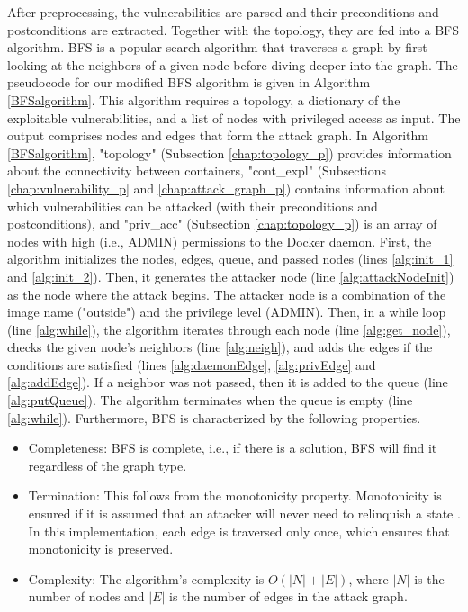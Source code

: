 After preprocessing, the vulnerabilities are parsed and their preconditions and postconditions are extracted. Together with the topology, they are fed into a BFS algorithm. BFS is a popular search algorithm that traverses a graph by first looking at the neighbors of a given node before diving deeper into the graph. The pseudocode for our modified BFS algorithm is given in Algorithm \ref{BFSalgorithm}. This algorithm requires a topology, a dictionary of the exploitable vulnerabilities, and a list of nodes with privileged access as input. The output comprises nodes and edges that form the attack graph. In Algorithm \ref{BFSalgorithm}, "topology" (Subsection \ref{chap:topology_p}) provides information about the connectivity between containers, "cont\_expl" (Subsections \ref{chap:vulnerability_p} and \ref{chap:attack_graph_p}) contains information about which vulnerabilities can be attacked (with their preconditions and postconditions), and "priv\_acc" (Subsection \ref{chap:topology_p}) is an array of nodes with high (i.e., ADMIN) permissions to the Docker daemon. First, the algorithm initializes the nodes, edges, queue, and passed nodes (lines \ref{alg:init_1} and \ref{alg:init_2}). Then, it generates the attacker node (line \ref{alg:attackNodeInit}) as the node where the attack begins. The attacker node is a combination of the image name ("outside") and the privilege level (ADMIN). Then, in a while loop (line \ref{alg:while}), the algorithm iterates through each node (line \ref{alg:get_node}), checks the given node's neighbors (line \ref{alg:neigh}), and adds the edges if the conditions are satisfied (lines \ref{alg:daemonEdge}, \ref{alg:privEdge} and \ref{alg:addEdge}). If a neighbor was not passed, then it is added to the queue (line \ref{alg:putQueue}). The algorithm terminates when the queue is empty (line \ref{alg:while}). Furthermore, BFS is characterized by the following properties.


\begin{itemize}
	\item Completeness: BFS is complete, i.e., if there is a solution, BFS will find it regardless of the graph type.
	\item Termination: This follows from the monotonicity property. Monotonicity is ensured if it is assumed that an attacker will never need to relinquish a state \cite{ingols2006practical, ou2006scalable, ammann2002scalable}. In this implementation, each edge is traversed only once, which ensures that monotonicity is preserved.
	\item  Complexity: The algorithm's complexity is $O(|N| + |E|)$, where $|N|$ is the number of nodes and $|E|$ is the number of edges in the attack graph.
\end{itemize}


